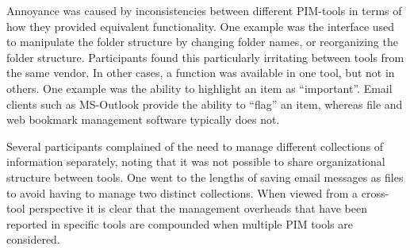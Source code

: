 Annoyance was caused by inconsistencies between different PIM-tools in terms of how they provided equivalent functionality.  One example was the interface used to manipulate the folder structure by changing folder names, or reorganizing the folder structure.  Participants found this particularly irritating between tools from the same vendor.  In other cases, a function was available in one tool, but not in others.  One example was the ability to highlight an item as ``important''.  Email clients such as MS-Outlook provide the ability to ``flag'' an item, whereas file and web bookmark management software typically does not.

Several participants complained of the need to manage different collections of information separately, noting that it was not possible to share organizational structure between tools.  One went to the lengths of saving email messages as files to avoid having to manage two distinct collections.  When viewed from a cross-tool perspective it is clear that the management overheads that have been reported in specific tools are compounded when multiple PIM tools are considered.

